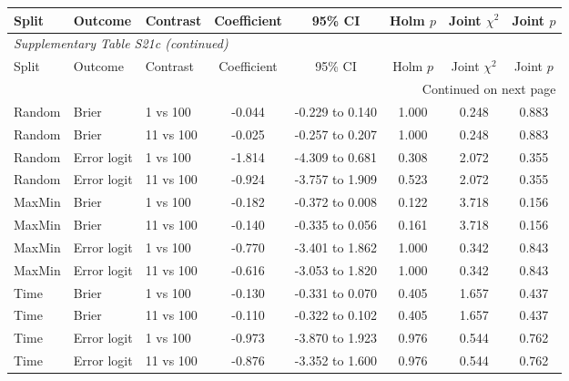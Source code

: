 \begin{longtable}{lllccccc}

\toprule Split & Outcome & Contrast & Coefficient & 95\% CI & Holm $p$ & Joint $\chi^2$ & Joint $p$ \\ \midrule\endfirsthead

\multicolumn{8}{l}{\textit{Supplementary Table S21c (continued)}} \\

\toprule Split & Outcome & Contrast & Coefficient & 95\% CI & Holm $p$ & Joint $\chi^2$ & Joint $p$ \\ \midrule\endhead

\midrule\multicolumn{8}{r}{Continued on next page}\\\endfoot\bottomrule\endlastfoot

Random & Brier & 1 vs 100 & -0.044 & -0.229 to 0.140 & 1.000 & 0.248 & 0.883 \\

Random & Brier & 11 vs 100 & -0.025 & -0.257 to 0.207 & 1.000 & 0.248 & 0.883 \\

Random & Error logit & 1 vs 100 & -1.814 & -4.309 to 0.681 & 0.308 & 2.072 & 0.355 \\

Random & Error logit & 11 vs 100 & -0.924 & -3.757 to 1.909 & 0.523 & 2.072 & 0.355 \\

MaxMin & Brier & 1 vs 100 & -0.182 & -0.372 to 0.008 & 0.122 & 3.718 & 0.156 \\

MaxMin & Brier & 11 vs 100 & -0.140 & -0.335 to 0.056 & 0.161 & 3.718 & 0.156 \\

MaxMin & Error logit & 1 vs 100 & -0.770 & -3.401 to 1.862 & 1.000 & 0.342 & 0.843 \\

MaxMin & Error logit & 11 vs 100 & -0.616 & -3.053 to 1.820 & 1.000 & 0.342 & 0.843 \\

Time & Brier & 1 vs 100 & -0.130 & -0.331 to 0.070 & 0.405 & 1.657 & 0.437 \\

Time & Brier & 11 vs 100 & -0.110 & -0.322 to 0.102 & 0.405 & 1.657 & 0.437 \\

Time & Error logit & 1 vs 100 & -0.973 & -3.870 to 1.923 & 0.976 & 0.544 & 0.762 \\

Time & Error logit & 11 vs 100 & -0.876 & -3.352 to 1.600 & 0.976 & 0.544 & 0.762 \\

\end{longtable}\endgroup

